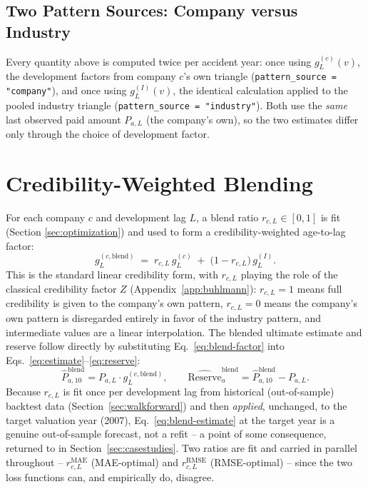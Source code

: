 \documentclass[11pt]{article}
\newcommand{\rmae}{r^{\text{MAE}}}
\newcommand{\rrmse}{r^{\text{RMSE}}}
\begin{document}
\subsection{Two Pattern Sources: Company versus Industry}

Every quantity above is computed twice per accident year: once using $g_L^{(c)}(v)$, the
development factors from company $c$'s own triangle (\texttt{pattern\_source = "company"}), and
once using $g_L^{(I)}(v)$, the identical calculation applied to the pooled industry triangle
(\texttt{pattern\_source = "industry"}). Both use the \emph{same} last observed paid amount
$P_{a,L}$ (the company's own), so the two estimates differ only through the choice of development
factor.

\section{Credibility-Weighted Blending}
\label{sec:blend}

For each company $c$ and development lag $L$, a blend ratio $r_{c,L} \in [0,1]$ is fit (Section
\ref{sec:optimization}) and used to form a credibility-weighted age-to-lag factor:
\begin{equation}
g_{L}^{(c,\text{blend})} \;=\; r_{c,L}\, g_{L}^{(c)} \;+\; \bigl(1-r_{c,L}\bigr)\, g_{L}^{(I)}.
\label{eq:blend-factor}
\end{equation}
This is the standard linear credibility form, with $r_{c,L}$ playing the role of the classical
credibility factor $Z$ (Appendix~\ref{app:buhlmann}): $r_{c,L}=1$ means full credibility is given
to the company's own pattern, $r_{c,L}=0$ means the company's own pattern is disregarded entirely
in favor of the industry pattern, and intermediate values are a linear interpolation. The blended
ultimate estimate and reserve follow directly by substituting Eq.~\eqref{eq:blend-factor} into
Eqs.~\eqref{eq:estimate}--\eqref{eq:reserve}:
\begin{equation}
\widehat{P}_{a,10}^{\text{blend}} = P_{a,L} \cdot g_{L}^{(c,\text{blend})}, \qquad
\widehat{\text{Reserve}}_a^{\text{blend}} = \widehat{P}_{a,10}^{\text{blend}} - P_{a,L}.
\label{eq:blend-estimate}
\end{equation}
Because $r_{c,L}$ is fit once per development lag from historical (out-of-sample) backtest data
(Section~\ref{sec:walkforward}) and then \emph{applied}, unchanged, to the target valuation year
(2007), Eq.~\eqref{eq:blend-estimate} at the target year is a genuine out-of-sample forecast, not a
refit -- a point of some consequence, returned to in Section~\ref{sec:casestudies}.
Two ratios are fit and carried in parallel throughout -- $\rmae_{c,L}$ (MAE-optimal) and
$\rrmse_{c,L}$ (RMSE-optimal) -- since the two loss functions can, and empirically do, disagree.
\end{document}
